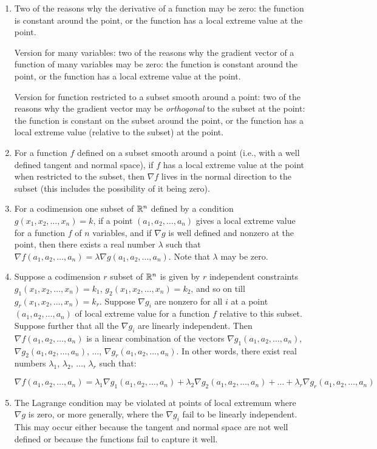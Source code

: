 \documentclass[10pt]{amsart}
\begin{document}
\begin{enumerate}
\item Two of the reasons why the derivative of a function may be zero:
  the function is constant around the point, or the function has a local
  extreme value at the point.

  Version for many variables: two of the reasons why the gradient
  vector of a function of many variables may be zero: the function is
  constant around the point, or the function has a local extreme value
  at the point.

  Version for function restricted to a subset smooth around a point:
  two of the reasons why the gradient vector may be {\em orthogonal}
  to the subset at the point: the function is constant on the subset
  around the point, or the function has a local extreme value
  (relative to the subset) at the point.
\item For a function $f$ defined on a subset smooth around a point
  (i.e., with a well defined tangent and normal space), if $f$ has a
  local extreme value at the point when restricted to the subset, then
  $\nabla f$ lives in the normal direction to the subset (this
  includes the possibility of it being zero).
\item For a codimension one subset of $\mathbb{R}^n$ defined by a condition
  $g(x_1,x_2,\dots,x_n) = k$, if a point $(a_1,a_2,\dots,a_n)$ gives a
  local extreme value for a function $f$ of $n$ variables, and if
  $\nabla g$ is well defined and nonzero at the point, then there
  exists a real number $\lambda$ such that $\nabla
  f(a_1,a_2,\dots,a_n) = \lambda \nabla g(a_1,a_2,\dots,a_n)$. Note
  that $\lambda$ may be zero.
\item Suppose a codimension $r$ subset of $\mathbb{R}^n$ is given by $r$
  independent constraints $g_1(x_1,x_2,\dots,x_n) = k_1$,
  $g_2(x_1,x_2,\dots,x_n) = k_2$, and so on till
  $g_r(x_1,x_2,\dots,x_n) = k_r$. Suppose $\nabla g_i$ are nonzero for
  all $i$ at a point $(a_1,a_2,\dots,a_n)$ of local extreme value for
  a function $f$ relative to this subset. Suppose further that all the
  $\nabla g_i$ are linearly independent. Then $\nabla
  f(a_1,a_2,\dots,a_n)$ is a linear combination of the vectors $\nabla
  g_1(a_1,a_2,\dots,a_n)$, $\nabla g_2(a_1,a_2,\dots,a_n)$, $\dots$,
  $\nabla g_r(a_1,a_2,\dots,a_n)$. In other words, there exist real
  numbers $\lambda_1$, $\lambda_2$, $\dots$, $\lambda_r$ such that:

  $$\nabla f(a_1,a_2,\dots,a_n) = \lambda_1\nabla g_1(a_1,a_2,\dots,a_n) + \lambda_2\nabla g_2(a_1,a_2,\dots,a_n) + \dots + \lambda_r\nabla g_r(a_1,a_2,\dots,a_n)$$
\item The Lagrange condition may be violated at points of local
  extremum where $\nabla g$ is zero, or more generally, where the
  $\nabla g_i$ fail to be linearly independent. This may occur either
  because the tangent and normal space are not well defined or because
  the functions fail to capture it well.
\end{enumerate}
\end{document}
